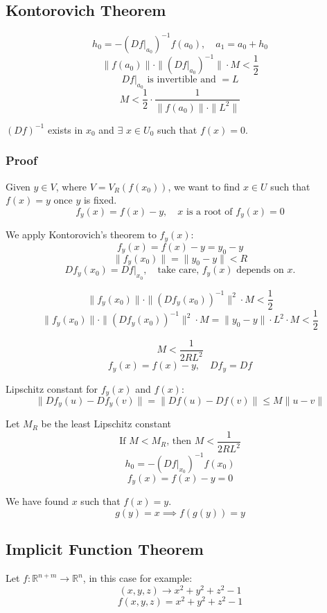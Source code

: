 \documentclass[11pt]{article}
\begin{document}
\subsection{Kontorovich Theorem}
\[
h_0 = - (Df\big|_{a_0})^{-1} f(a_0), \quad a_1 = a_0 + h_0
\]
\[
\|f(a_0)\| \cdot \| (Df\big|_{a_0})^{-1} \| \cdot M < \frac{1}{2}
\]
\[
Df\big|_{a_0} \text{ is invertible and } = L
\]
\[
M < \frac{1}{2} \cdot \frac{1}{\|f(a_0)\| \cdot \|L^{2}\|}
\]

$(Df)^{-1}$ exists in $x_0$ and $\exists$ $x \in U_0$ such that $f(x) = 0$.

\subsubsection{Proof}
Given $y \in V$, where $V = V_R(f(x_0))$, we want to find $x \in U$ such that $f(x) = y$ once $y$ is fixed.
\[
f_y(x) = f(x) - y, \quad x \text{ is a root of } f_y(x) = 0
\]

We apply Kontorovich's theorem to $f_y(x)$:
\[
f_y(x) = f(x) - y = y_0 - y
\]
\[
\|f_y(x_0)\| = \|y_0 - y\| < R
\]
\[
Df_y(x_0) = Df\big|_{x_0}, \quad \text{take care, } f_y(x) \text{ depends on } x.
\]

\[
\|f_y(x_0)\| \cdot \|(Df_y(x_0))^{-1}\|^2 \cdot M < \frac{1}{2}
\]
\[
\|f_y(x_0)\| \cdot \|(Df_y(x_0))^{-1}\|^2 \cdot M = \|y_0 - y\| \cdot L^2 \cdot M < \frac{1}{2}
\]

\[
M < \frac{1}{2RL^2}
\]
\[
f_y(x) = f(x) - y, \quad Df_y = Df
\]

Lipschitz constant for $f_y(x)$ and $f(x)$:
\[
\|Df_y(u) - Df_y(v)\| = \|Df(u) - Df(v)\| \leq M \|u - v\|
\]

Let $M_R$ be the least Lipschitz constant
\[
\text{If } M < M_R \text{, then } M < \frac{1}{2RL^2}
\]
\[
h_0 = - (Df\big|_{x_0})^{-1} f(x_0)
\]
\[
f_y(x) = f(x) - y = 0
\]

We have found $x$ such that $f(x) = y$.
\[
g(y) = x \implies f(g(y)) = y
\]

\subsection{Implicit Function Theorem}
Let $f : \mathbb{R}^{n+m} \rightarrow \mathbb{R}^n$, in this case for example:
\[
(x,y,z) \rightarrow x^2 + y^2 + z^2 - 1
\]
\[
f(x,y,z) = x^2 + y^2 + z^2 - 1
\]
\end{document}
